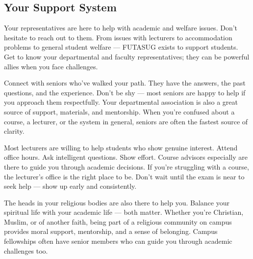 \documentclass[11pt,a4paper]{article}
\begin{document}
\subsection{Your Support System}

\begin{tcolorbox}[colback=lightGray,colframe=primary,title={\color{white}\textbf{FUTA Student Union Govt (FUTASUG)}},colbacktitle=primary,arc=4pt,breakable]
Your representatives are here to help with academic and welfare issues. Don't hesitate to reach out to them. From issues with lecturers to accommodation problems to general student welfare --- FUTASUG exists to support students. Get to know your departmental and faculty representatives; they can be powerful allies when you face challenges.
\end{tcolorbox}

\begin{tcolorbox}[colback=lightGray,colframe=primary,title={\color{white}\textbf{Departmental Associations \& Seniors}},colbacktitle=primary,arc=4pt,breakable]
Connect with seniors who've walked your path. They have the answers, the past questions, and the experience. Don't be shy --- most seniors are happy to help if you approach them respectfully. Your departmental association is also a great source of support, materials, and mentorship. When you're confused about a course, a lecturer, or the system in general, seniors are often the fastest source of clarity.
\end{tcolorbox}

\begin{tcolorbox}[colback=lightGray,colframe=primary,title={\color{white}\textbf{Lecturers \& Course Advisors}},colbacktitle=primary,arc=4pt,breakable]
Most lecturers are willing to help students who show genuine interest. Attend office hours. Ask intelligent questions. Show effort. Course advisors especially are there to guide you through academic decisions. If you're struggling with a course, the lecturer's office is the right place to be. Don't wait until the exam is near to seek help --- show up early and consistently.
\end{tcolorbox}

\begin{tcolorbox}[colback=lightGray,colframe=primary,title={\color{white}\textbf{Religious Groups}},colbacktitle=primary,arc=4pt,breakable]
The heads in your religious bodies are also there to help you. Balance your spiritual life with your academic life --- both matter. Whether you're Christian, Muslim, or of another faith, being part of a religious community on campus provides moral support, mentorship, and a sense of belonging. Campus fellowships often have senior members who can guide you through academic challenges too.
\end{tcolorbox}
\end{document}
